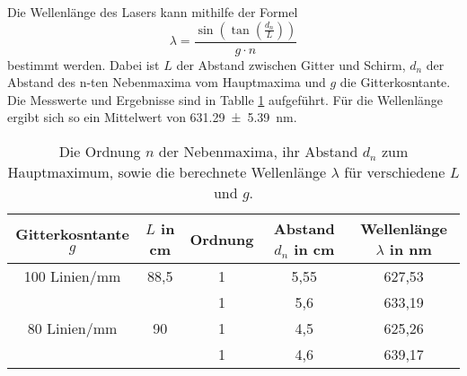 Die Wellenlänge des Lasers kann mithilfe der Formel
\begin{equation}
  \lambda = \frac{\sin\left(\tan\left(\frac{d_n}{L}\right)\right)}{g \cdot n}
\end{equation}
bestimmt werden.
Dabei ist $L$ der Abstand zwischen Gitter und Schirm, $d_n$ der Abstand des n-ten Nebenmaxima vom Hauptmaxima und $g$ die Gitterkosntante.
Die Messwerte und Ergebnisse sind in Tablle \ref{tab:wel} aufgeführt.
Für die Wellenlänge ergibt sich so ein Mittelwert von \SI{631.29(539)}{nm}.

\begin{table}
 \centering
 \caption{Die Ordnung $n$ der Nebenmaxima, ihr Abstand $d_n$ zum Hauptmaximum,  sowie die berechnete Wellenlänge $\lambda$ für verschiedene $L$ und $g$.}
 \label{tab:wel}
 \begin{tabular}{c c c c c}
   \toprule
   Gitterkosntante $g$ & $L$ in cm & Ordnung & Abstand $d_n$ in cm & Wellenlänge $\lambda$ in nm \\
   \midrule
   100 Linien/mm & 88,5 & 1 & 5,55  & 627,53 \\
   & & 1 & 5,6 & 633,19 \\
   80 Linien/mm & 90 & 1 & 4,5  & 625,26 \\
   & & 1 & 4,6 & 639,17\\
   \bottomrule
 \end{tabular}
\end{table}

